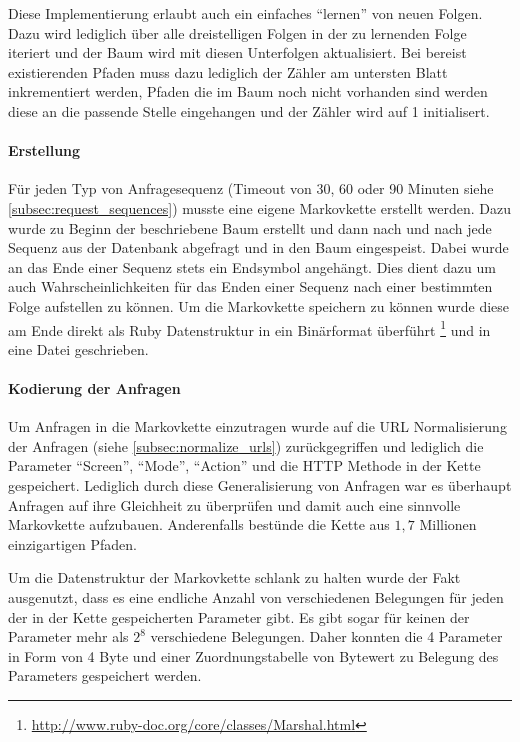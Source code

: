 \documentclass[10pt]{scrartcl}
\begin{document}
  Diese Implementierung erlaubt auch ein einfaches ``lernen'' von neuen Folgen.
  Dazu wird lediglich über alle dreistelligen Folgen in der zu lernenden Folge iteriert und der Baum wird mit diesen Unterfolgen aktualisiert. Bei bereist existierenden Pfaden muss dazu lediglich der Zähler am untersten Blatt inkrementiert werden, Pfaden die im Baum noch nicht vorhanden sind werden diese an die passende Stelle eingehangen und der Zähler wird auf 1 initialisert.
  
  \paragraph{Erstellung}
  \label{par:markov_generate}
  Für jeden Typ von Anfragesequenz (Timeout von 30, 60 oder 90 Minuten siehe \ref{subsec:request_sequences}) musste eine eigene Markovkette erstellt werden. Dazu wurde zu Beginn der beschriebene Baum erstellt und dann nach und nach jede Sequenz aus der Datenbank abgefragt und in den Baum eingespeist. Dabei wurde an das Ende einer Sequenz stets ein Endsymbol angehängt. Dies dient dazu um auch Wahrscheinlichkeiten für das Enden einer Sequenz nach einer bestimmten Folge aufstellen zu können. Um die Markovkette speichern zu können wurde diese am Ende direkt als Ruby Datenstruktur in ein Binärformat überführt \footnote{\url{http://www.ruby-doc.org/core/classes/Marshal.html}} und in eine Datei geschrieben.
  
  \paragraph{Kodierung der Anfragen}
  \label{para:request_encoding}
  Um Anfragen in die Markovkette einzutragen wurde auf die URL Normalisierung der Anfragen (siehe \ref{subsec:normalize_urls}) zurückgegriffen und lediglich die Parameter ``Screen'', ``Mode'', ``Action'' und die HTTP Methode in der Kette gespeichert. Lediglich durch diese Generalisierung von Anfragen war es überhaupt Anfragen auf ihre Gleichheit zu überprüfen und damit auch eine sinnvolle Markovkette aufzubauen. Anderenfalls bestünde die Kette aus $1,7$ Millionen einzigartigen Pfaden.
  
  Um die Datenstruktur der Markovkette schlank zu halten wurde der Fakt ausgenutzt, dass es eine endliche Anzahl von verschiedenen Belegungen für jeden der in der Kette gespeicherten Parameter gibt. Es gibt sogar für keinen der Parameter mehr als $2^8$ verschiedene Belegungen. Daher konnten die 4 Parameter in Form von 4 Byte und einer Zuordnungstabelle von Bytewert zu Belegung des Parameters gespeichert werden.
  
\end{document}

